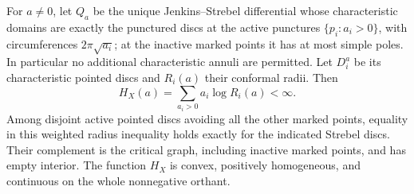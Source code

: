\begin{theorem}
\label{C:A2b-support}
For $a\ne0$, let $Q_a$ be the unique Jenkins--Strebel differential whose characteristic domains are exactly the punctured discs at the active punctures $\{p_i:a_i>0\}$, with circumferences $2\pi\sqrt{a_i}$; at the inactive marked points it has at most simple poles. In particular no additional characteristic annuli are permitted. Let $D_i^a$ be its characteristic pointed discs and $R_i(a)$ their conformal radii. Then
\[
 H_X(a)=\sum_{a_i>0}a_i\log R_i(a)<\infty.
\]
Among disjoint active pointed discs avoiding all the other marked points, equality in this weighted radius inequality holds exactly for the indicated Strebel discs. Their complement is the critical graph, including inactive marked points, and has empty interior. The function $H_X$ is convex, positively homogeneous, and continuous on the whole nonnegative orthant.
\end{theorem}
